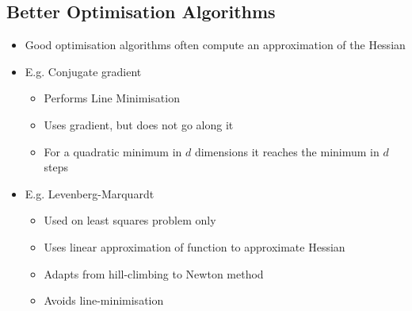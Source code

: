 \begin{slide}
\section[-1]{Better Optimisation Algorithms}

\begin{PauseHighLight}

\begin{itemize}
\item Good optimisation algorithms often compute an approximation of the
  Hessian\pause
\item E.g. Conjugate gradient\pause
  \begin{itemize}\squeeze
  \item Performs Line Minimisation\pause
  \item Uses gradient, but does not go along it\pause
  \item For a quadratic minimum in $d$ dimensions it reaches the
    minimum in $d$ steps\pause
  \end{itemize}
\item E.g. Levenberg-Marquardt\pause
  \begin{itemize}\squeeze
  \item Used on least squares problem only\pause
  \item Uses linear approximation of function to approximate Hessian\pause
  \item Adapts from hill-climbing to Newton method\pause
  \item Avoids line-minimisation\pause
  \end{itemize}
\end{itemize}

\end{PauseHighLight}
\end{slide}


